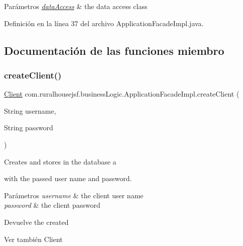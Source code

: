 \begin{DoxyParams}{Parámetros}
{\em \mbox{\hyperlink{namespacecom_1_1ruralhousejsf_1_1data_access}{data\+Access}}} & the data access class \\
\hline
\end{DoxyParams}


Definición en la línea 37 del archivo Application\+Facade\+Impl.\+java.



\subsection{Documentación de las funciones miembro}
\mbox{\label{classcom_1_1ruralhousejsf_1_1business_logic_1_1_application_facade_impl_ae48e63f3df5226e46e4a57a64d120823}} 
\subsubsection{\texorpdfstring{createClient()}{createClient()}}
{\footnotesize\ttfamily \mbox{\hyperlink{classcom_1_1ruralhousejsf_1_1domain_1_1_client}{Client}} com.\+ruralhousejsf.\+business\+Logic.\+Application\+Facade\+Impl.\+create\+Client (\begin{DoxyParamCaption}\item[{String}]{username,  }\item[{String}]{password }\end{DoxyParamCaption})}

Creates and stores in the database a
\begin{DoxyCode}{0}
\end{DoxyCode}
 with the passed user name and password.


\begin{DoxyParams}{Parámetros}
{\em username} & the client user name \\
\hline
{\em password} & the client password\\
\hline
\end{DoxyParams}
\begin{DoxyReturn}{Devuelve}
the created
\begin{DoxyCode}{0}
\end{DoxyCode}

\end{DoxyReturn}
\begin{DoxySeeAlso}{Ver también}
Client 
\end{DoxySeeAlso}


